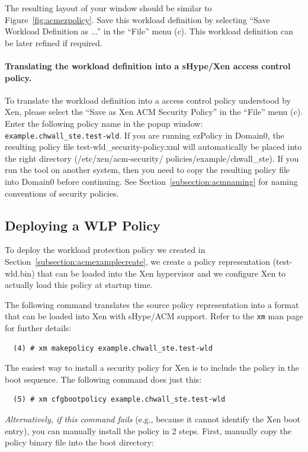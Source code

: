 \documentclass[11pt,twoside,final,openright]{report}
\begin{document}
The resulting layout of your window should be similar to
Figure~\ref{fig:acmezpolicy}. Save this workload definition by
selecting ``Save Workload Definition as ...'' in the ``File'' menu
(c).  This workload definition can be later refined if required.

\paragraph{Translating the workload definition into a sHype/Xen access
  control policy.} To translate the workload definition into a access
control policy understood by Xen, please select the ``Save as Xen ACM
Security Policy'' in the ``File'' menu (c). Enter the following policy
name in the popup window: \verb|example.chwall_ste.test-wld|. If you
are running ezPolicy in Domain0, the resulting policy file
test-wld\_security-policy.xml will automatically be placed into the
right directory (/etc/xen/acm-security/ policies/example/chwall\_ste).
If you run the tool on another system, then you need to copy the
resulting policy file into Domain0 before continuing.  See
Section~\ref{subsection:acmnaming} for naming conventions of security
policies.

\subsection{Deploying a WLP Policy}
\label{subsection:acmexampleinstall}
To deploy the workload protection policy we created in
Section~\ref{subsection:acmexamplecreate}, we create a policy
representation (test-wld.bin) that can be loaded into the Xen
hypervisor and we configure Xen to actually load this policy at
startup time.

The following command translates the source policy representation
into a format that can be loaded into Xen with sHype/ACM support.
Refer to the \verb|xm| man page for further details:

\begin{verbatim}
  (4) # xm makepolicy example.chwall_ste.test-wld
\end{verbatim}

The easiest way to install a security policy for Xen is to include the
policy in the boot sequence. The following command does just this:

\begin{verbatim}
  (5) # xm cfgbootpolicy example.chwall_ste.test-wld
\end{verbatim}

\textit{Alternatively, if this command fails} (e.g., because it cannot
identify the Xen boot entry), you can manually install the policy in 2
steps.  First, manually copy the policy binary file into the boot
directory:
\end{document}

